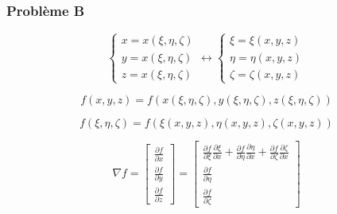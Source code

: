 \documentclass
[
a4paper,                      %
twoside,					  %
12pt,                         %
abstract,		      %
fleqn,                        %
]
{scrartcl} %
\begin{document}
\subsubsection{Probl\`eme B}

\begin{equation}
\begin{cases}
x=x\left(\xi,\eta,\zeta\right)\\
y=x\left(\xi,\eta,\zeta\right)\\
z=x\left(\xi,\eta,\zeta\right)
\end{cases}\longleftrightarrow\begin{cases}
\xi=\xi\left(x,y,z\right)\\
\eta=\eta\left(x,y,z\right)\\
\zeta=\zeta\left(x,y,z\right)
\end{cases}
\end{equation}

\begin{equation}
f\left(x,y,z\right)=f\left(x\left(\xi,\eta,\zeta\right),y\left(\xi,\eta,\zeta\right),z\left(\xi,\eta,\zeta\right)\right)
\end{equation}

\begin{equation}
f\left(\xi,\eta,\zeta\right)=f\left(\xi\left(x,y,z\right),\eta\left(x,y,z\right),\zeta\left(x,y,z\right)\right)
\end{equation}

\begin{equation}
\nabla f=\begin{bmatrix}
\frac{\partial f}{\partial x}\\[5pt]
\frac{\partial f}{\partial y}\\[5pt]
\frac{\partial f}{\partial z}
\end{bmatrix}=\begin{bmatrix}
\frac{\partial f}{\partial\xi}\frac{\partial\xi}{\partial x}+\frac{\partial f}{\partial\eta}\frac{\partial\eta}{\partial x}+\frac{\partial f}{\partial\zeta}\frac{\partial\zeta}{\partial x}\\[5pt]
\frac{\partial f}{\partial\eta}\\[5pt]
\frac{\partial f}{\partial\zeta}
\end{bmatrix}
\end{equation}


\clearscrheadings
\pagestyle{scrheadings}
\manualmark
\ofoot{\\\pagemark} %
\ifoot{} %
\setheadtopline{2pt}
\setheadsepline{0.5pt}
\setfootsepline{0.5pt}
\end{document}
